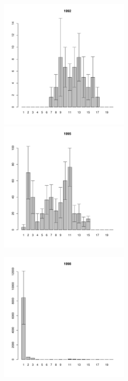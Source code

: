 \documentclass[12pt, a4paper]{article}
\begin{document}

\begin{figure}[h]

\begin{multicols}{3}
\hfill
\includegraphics[width=65mm]{../White_Sea/Estuatiy_Luvenga/sizestr_1992_.pdf}
\hfill
\includegraphics[width=65mm]{../White_Sea/Estuatiy_Luvenga/sizestr_1995_.pdf}

\hfill
\includegraphics[width=65mm]{../White_Sea/Estuatiy_Luvenga/sizestr_1998_.pdf}


\end{multicols}
\end{figure}
\end{document}
